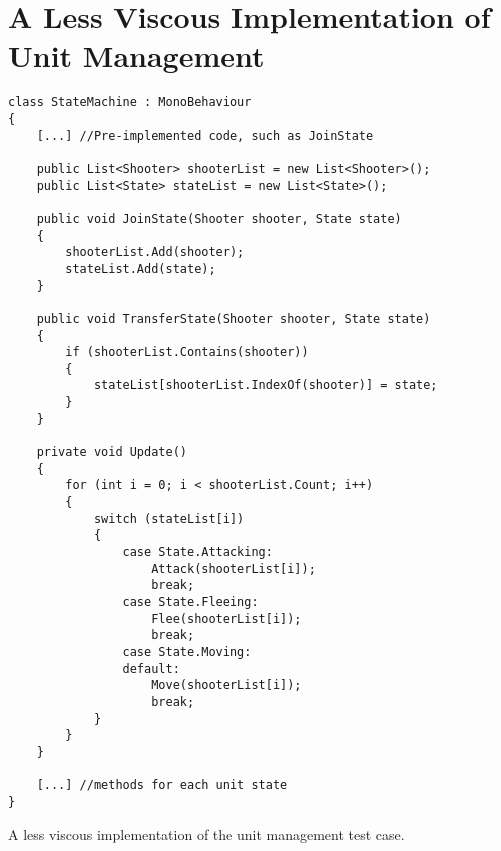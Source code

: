 \section{A Less Viscous Implementation of Unit Management} \label{app:csharp:non:viscous}
\begin{listing}
\begin{verbatim}
class StateMachine : MonoBehaviour
{
    [...] //Pre-implemented code, such as JoinState

    public List<Shooter> shooterList = new List<Shooter>();
    public List<State> stateList = new List<State>();

    public void JoinState(Shooter shooter, State state)
    {
        shooterList.Add(shooter);
        stateList.Add(state);
    }

    public void TransferState(Shooter shooter, State state)
    {
        if (shooterList.Contains(shooter))
        {
            stateList[shooterList.IndexOf(shooter)] = state;
        }
    }

    private void Update()
    {
        for (int i = 0; i < shooterList.Count; i++)
        {
            switch (stateList[i])
            {
                case State.Attacking:
                    Attack(shooterList[i]);
                    break;
                case State.Fleeing:
                    Flee(shooterList[i]);
                    break;
                case State.Moving:
                default:
                    Move(shooterList[i]);
                    break;
            }
        }
    }

    [...] //methods for each unit state
}
\end{verbatim}
\caption{A less viscous implementation of the unit management test case.}
\label{lst:um:less:viscous}
\end{listing}

